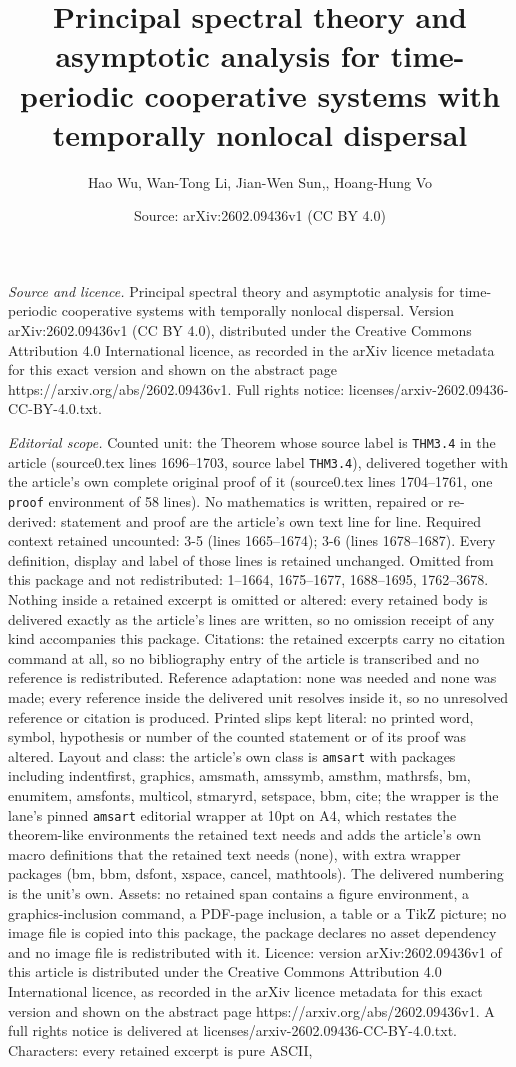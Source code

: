 \documentclass[10pt,a4paper]{amsart}
\title[Principal spectral theory and asymptotic analysis for time-p]{Principal spectral theory and asymptotic analysis for time-periodic cooperative systems with temporally nonlocal dispersal}
\author{Hao Wu, Wan-Tong Li, Jian-Wen Sun,, Hoang-Hung Vo}
\date{Source: arXiv:2602.09436v1 (CC BY 4.0)}
\begin{document}
\maketitle

\noindent\emph{Source and licence.} Principal spectral theory and asymptotic analysis for time-periodic cooperative systems with temporally nonlocal dispersal. Version arXiv:2602.09436v1 (CC BY 4.0), distributed under the Creative Commons Attribution 4.0 International licence, as recorded in the arXiv licence metadata for this exact version and shown on the abstract page https://arxiv.org/abs/2602.09436v1. Full rights notice: licenses/arxiv-2602.09436-CC-BY-4.0.txt.\par\smallskip

\noindent\textit{Editorial scope.} Counted unit: the Theorem whose source label is \texttt{THM3.4} in the article (source0.tex lines 1696--1703, source label \texttt{THM3.4}), delivered together with the article's own complete original proof of it (source0.tex lines 1704--1761, one \texttt{proof} environment of 58 lines). No mathematics is written, repaired or re-derived: statement and proof are the article's own text line for line. Required context retained uncounted: 3-5 (lines 1665--1674); 3-6 (lines 1678--1687). Every definition, display and label of those lines is retained unchanged. Omitted from this package and not redistributed: 1--1664, 1675--1677, 1688--1695, 1762--3678. Nothing inside a retained excerpt is omitted or altered: every retained body is delivered exactly as the article's lines are written, so no omission receipt of any kind accompanies this package. Citations: the retained excerpts carry no citation command at all, so no bibliography entry of the article is transcribed and no reference is redistributed. Reference adaptation: none was needed and none was made; every reference inside the delivered unit resolves inside it, so no unresolved reference or citation is produced. Printed slips kept literal: no printed word, symbol, hypothesis or number of the counted statement or of its proof was altered. Layout and class: the article's own class is \texttt{amsart} with packages including indentfirst, graphics, amsmath, amssymb, amsthm, mathrsfs, bm, enumitem, amsfonts, multicol, stmaryrd, setspace, bbm, cite; the wrapper is the lane's pinned \texttt{amsart} editorial wrapper at 10pt on A4, which restates the theorem-like environments the retained text needs and adds the article's own macro definitions that the retained text needs (none), with extra wrapper packages (bm, bbm, dsfont, xspace, cancel, mathtools). The delivered numbering is the unit's own. Assets: no retained span contains a figure environment, a graphics-inclusion command, a PDF-page inclusion, a table or a TikZ picture; no image file is copied into this package, the package declares no asset dependency and no image file is redistributed with it. Licence: version arXiv:2602.09436v1 of this article is distributed under the Creative Commons Attribution 4.0 International licence, as recorded in the arXiv licence metadata for this exact version and shown on the abstract page https://arxiv.org/abs/2602.09436v1. A full rights notice is delivered at licenses/arxiv-2602.09436-CC-BY-4.0.txt. Characters: every retained excerpt is pure ASCII, 
\end{document}

